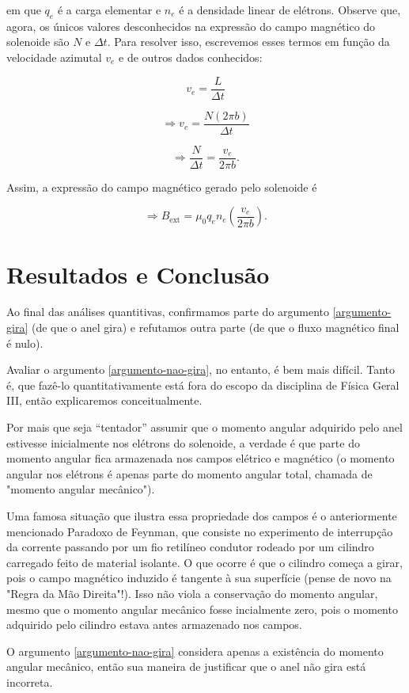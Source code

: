 \documentclass[
	article,
	11pt,
	oneside,
	a4paper,
	english,
	brazil,
	sumario=tradicional
	]{abntex2}
\begin{document}
em que $q_e$ é a carga elementar e $n_e$ é a densidade linear de elétrons. Observe que, agora, os únicos valores desconhecidos na expressão do campo magnético do solenoide são $N$ e $\Delta t$. Para resolver isso, escrevemos esses termos em função da velocidade azimutal $v_e$ e de outros dados conhecidos:

\begin{equation}
    v_e = \frac{L}{\Delta t}
\end{equation}

\begin{equation}
    \Rightarrow v_e = \frac{N(2\pi b)}{\Delta t}
\end{equation}

\begin{equation}
    \Rightarrow \frac{N}{\Delta t} = \frac{v_e}{2\pi b}.
\end{equation}

Assim, a expressão do campo magnético gerado pelo solenoide é

\begin{equation}
    \Rightarrow B_{\text{ext}} = \mu_0 q_e n_e \left(\frac{v_e}{2\pi b}\right).
\end{equation}

\section{Resultados e Conclusão}

Ao final das análises quantitivas, confirmamos parte do argumento \ref{argumento-gira} (de que o anel gira) e refutamos outra parte (de que o fluxo magnético final é nulo).

Avaliar o argumento \ref{argumento-nao-gira}, no entanto, é bem mais difícil. Tanto é, que fazê-lo quantitativamente está fora do escopo da disciplina de Física Geral III, então explicaremos conceitualmente.

Por mais que seja ``tentador'' assumir que o momento angular adquirido pelo anel estivesse inicialmente nos elétrons do solenoide, a verdade é que parte do momento angular fica armazenada nos campos elétrico e magnético (o momento angular nos elétrons é apenas parte do momento angular total, chamada de "momento angular mecânico").

Uma famosa situação que ilustra essa propriedade dos campos é o anteriormente mencionado Paradoxo de Feynman, que consiste no experimento de interrupção da corrente passando por um fio retilíneo condutor rodeado por um cilindro carregado feito de material isolante. O que ocorre é que o cilindro começa a girar, pois o campo magnético induzido é tangente à sua superfície (pense de novo na "Regra da Mão Direita"!). Isso não viola a conservação do momento angular, mesmo que o momento angular mecânico fosse incialmente zero, pois o momento adquirido pelo cilindro estava antes armazenado nos campos.

O argumento \ref{argumento-nao-gira} considera apenas a existência do momento angular mecânico, então sua maneira de justificar que o anel não gira está incorreta.

\nocite{leclair_2008, reville_2016}

\pagebreak
\onecolumn{
\postextual

}
\end{document}
